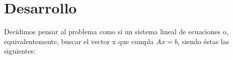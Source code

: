 \section{Desarrollo}

Decidimos pensar al problema como si un sistema lineal de ecuaciones o, 
equivalentemente, buscar el vector x que cumpla $Ax=b$, siendo éstas las siguientes:
